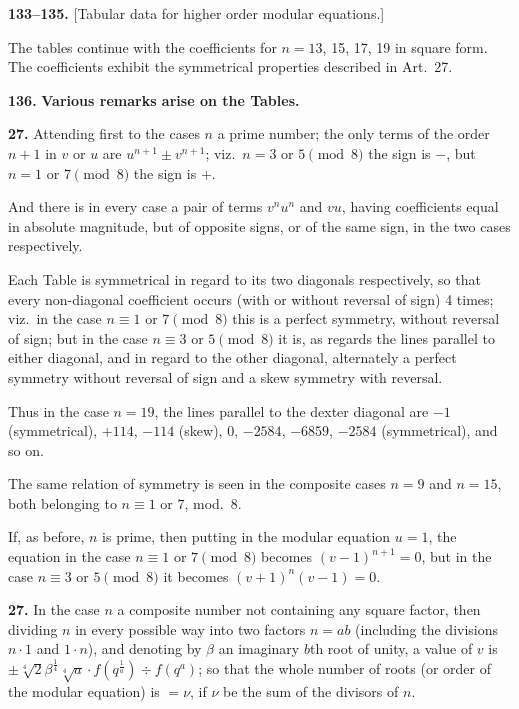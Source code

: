\documentclass[11pt,a4paper]{book}
\begin{document}
\medskip
\noindent\textbf{133--135.} [Tabular data for higher order modular equations.]

The tables continue with the coefficients for $n = 13$, 15, 17, 19 in square form. The coefficients exhibit the symmetrical properties described in Art.~27.

\medskip
\noindent\textbf{136.} \textbf{Various remarks arise on the Tables.}

\medskip
\noindent\textbf{27.} Attending first to the cases $n$ a prime number; the only terms of the order $n + 1$ in $v$ or $u$ are $u^{n+1} \pm v^{n+1}$; viz.\ $n = 3$ or $5 \pmod{8}$ the sign is $-$, but $n = 1$ or $7 \pmod{8}$ the sign is $+$.

And there is in every case a pair of terms $v^n u^n$ and $vu$, having coefficients equal in absolute magnitude, but of opposite signs, or of the same sign, in the two cases respectively.

Each Table is symmetrical in regard to its two diagonals respectively, so that every non-diagonal coefficient occurs (with or without reversal of sign) 4 times; viz.\ in the case $n \equiv 1$ or $7 \pmod{8}$ this is a perfect symmetry, without reversal of sign; but in the case $n \equiv 3$ or $5 \pmod{8}$ it is, as regards the lines parallel to either diagonal, and in regard to the other diagonal, alternately a perfect symmetry without reversal of sign and a skew symmetry with reversal.

Thus in the case $n = 19$, the lines parallel to the dexter diagonal are $-1$ (symmetrical), $+114$, $-114$ (skew), $0$, $-2584$, $-6859$, $-2584$ (symmetrical), and so on.

The same relation of symmetry is seen in the composite cases $n = 9$ and $n = 15$, both belonging to $n \equiv 1$ or $7$, mod.~8.

If, as before, $n$ is prime, then putting in the modular equation $u = 1$, the equation in the case $n \equiv 1$ or $7 \pmod{8}$ becomes $(v - 1)^{n+1} = 0$, but in the case $n \equiv 3$ or $5 \pmod{8}$ it becomes $(v + 1)^n(v - 1) = 0$.

\medskip
\noindent\textbf{27.} In the case $n$ a composite number not containing any square factor, then dividing $n$ in every possible way into two factors $n = ab$ (including the divisions $n \cdot 1$ and $1 \cdot n$), and denoting by $\beta$ an imaginary $b$th root of unity, a value of $v$ is $\pm\sqrt[4]{2}\beta^{\frac{1}{4}}\sqrt[4]{a} \cdot f(q^{\frac{1}{a}}) \div f(q^a)$; so that the whole number of roots (or order of the modular equation) is $= \nu$, if $\nu$ be the sum of the divisors of $n$.
\end{document}

